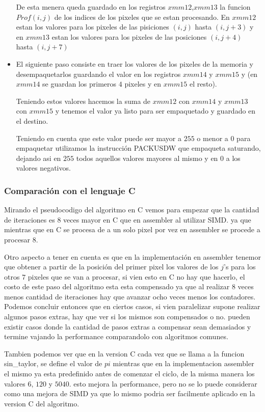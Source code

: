 \begin{itemize}
	De esta menera queda guardado en los registros $xmm12$,$xmm13$ la funcion $Prof(i,j)$ de los indices de los pixeles que se estan procesando. En $xmm12$ estan los valores para los pixeles de las pisiciones $(i,j)$ hasta $(i,j+3)$ y en $xmm13$ estan los valores para los pixeles de las posiciones $(i,j+4)$ hasta $(i,j+7)$

	\item El siguiente paso consiste en traer los valores de los pixeles de la memoria y desempaquetarlos guardando el valor en los registros $xmm14$ y $xmm15$ y (en $xmm14$ se guardan los primeros $4$ pixeles y en $xmm15$ el resto).

	Teniendo estos valores hacemos la suma de $xmm12$ con $xmm14$ y $xmm13$ con $xmm15$ y tenemos el valor ya listo para ser empaquetado y guardado en el destino.

	Teniendo en cuenta que este valor puede ser mayor a $255$ o menor a $0$ para empaquetar utilizamos la instrucción PACKUSDW que empaqueta saturando, dejando asi en $255$ todos aquellos valores mayores al mismo y en $0$ a los valores negativos.

\end{itemize}

\subsubsection{Comparación con el lenguaje C}

Mirando el pseudocodigo del algoritmo en C vemos para empezar que la cantidad de iteraciones es 8 veces mayor en C que en assembler al utilizar SIMD. ya que mientras que en C se procesa de a un solo pixel por vez en assembler se procede a procesar 8.

Otro aspecto a tener en cuenta es que en la implementación en assembler tenemor que obtener a partir de la posición del primer pixel los valores de los $j$'s para los otros $7$ pixeles que se van a procesar, si vien esto en C no hay que hacerlo, el costo de este paso del algoritmo esta esta compensado ya que al realizar 8 veces menos cantidad de iteraciones hay que avanzar ocho veces menos los contadores. Podemos concluir entonces que en ciertos casos, si vien paralelizar supone realizar algunos pasos extras, hay que ver si los mismos son compensados o no. pueden existir casos donde la cantidad de pasos extras a compensar sean demasiados y termine vajando la performance comparandolo con algoritmos comunes.

Tambien podemos ver que en la version C cada vez que se llama a la funcion sin_taylor, se define el valor de $pi$ mientras que en la implementacion assembler el mismo ya esta predefinido antes de comenzar el ciclo, de la misma manera los valores $6$, $120$ y $5040$. esto mejora la performance, pero no se lo puede considerar como una mejora de SIMD ya que lo mismo podria ser facilmente aplicado en la version C del algoritmo.

